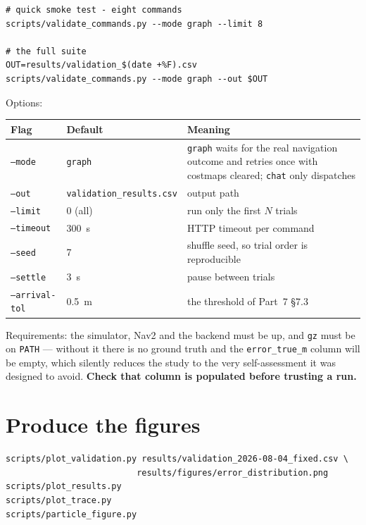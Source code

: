 \documentclass[11pt,a4paper]{report}
\newcommand{\file}[1]{\texttt{\small #1}}
\begin{document}
\begin{plain}
\begin{verbatim}
# quick smoke test - eight commands
scripts/validate_commands.py --mode graph --limit 8

# the full suite
OUT=results/validation_$(date +%F).csv
scripts/validate_commands.py --mode graph --out $OUT
\end{verbatim}

Options:
\begin{center}
\small
\begin{tabular}{@{}lp{}p{}@{}}
\toprule
\textbf{Flag} & \textbf{Default} & \textbf{Meaning} \\
\midrule
\file{--mode} & \file{graph} & \file{graph} waits for the real navigation
   outcome and retries once with costmaps cleared; \file{chat} only dispatches \\
\file{--out} & {\scriptsize\texttt{validation\_\newline results.csv}} & output path \\
\file{--limit} & 0 (all) & run only the first $N$ trials \\
\file{--timeout} & \SI{300}{\second} & HTTP timeout per command \\
\file{--seed} & 7 & shuffle seed, so trial order is reproducible \\
\file{--settle} & \SI{3}{\second} & pause between trials \\
\file{--arrival-tol} & \SI{0.5}{\metre} & the threshold of Part~7 \S7.3 \\
\bottomrule
\end{tabular}
\end{center}

Requirements: the simulator, Nav2 and the backend must be up, and \file{gz}
must be on \file{PATH} --- without it there is no ground truth and the
\file{error\_true\_m} column will be empty, which silently reduces the study to
the very self-assessment it was designed to avoid. \textbf{Check that column is
populated before trusting a run.}
\end{plain}

\section{Produce the figures}

\begin{plain}
\begin{verbatim}
scripts/plot_validation.py results/validation_2026-08-04_fixed.csv \
                          results/figures/error_distribution.png
scripts/plot_results.py
scripts/plot_trace.py
scripts/particle_figure.py
\end{verbatim}
\end{plain}
\end{document}
